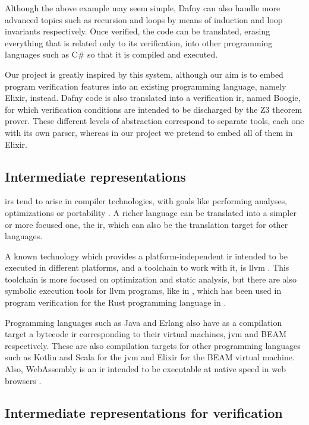 Although the above example may seem simple, Dafny can also handle more advanced
topics such as recursion and loops by means of induction and loop invariants
respectively. Once verified, the code can be translated, erasing everything that
is related only to its verification, into other programming languages such as
C\# so that it is compiled and executed. 

Our project is greatly inspired by this system, although our aim is to embed
program verification features into an existing programming language, namely
Elixir, instead. Dafny code is also translated into a verification \gls{ir}, 
named Boogie, for which verification conditions are intended to be discharged by
the Z3 theorem prover. These different levels of abstraction correspond to
separate tools, each one with its own parser, whereas in our project we pretend
to embed all of them in Elixir.

\subsection{Intermediate representations}

\gls{ir}s tend to arise in compiler technologies, with goals like performing
analyses, optimizations or portability \citep{FormalizingLLVMIR}. A richer
language can be translated into a simpler or more focused one, the \gls{ir},
which can also be the translation target for other languages.

A known technology which provides a platform-independent \gls{ir} intended to be
executed in different platforms, and a toolchain to work with it, is \gls{llvm}
\citep{LLVM}. This toolchain is more focused on optimization and static
analysis, but there are also symbolic execution tools for \gls{llvm} programs,
like in \cite{cadar2008klee}, which has been used in program verification for
the Rust programming language in \citep{lindner2018no}.

Programming languages such as Java and Erlang also have as a compilation target
a bytecode \gls{ir} corresponding to their virtual machines, \gls{jvm} 
\citep{lindholm2013java} and BEAM \citep{stenman2015erlang} respectively. These
are also compilation targets for other programming languages such as Kotlin and
Scala for the \gls{jvm} and Elixir for the BEAM virtual machine.  Also,
WebAssembly is an \gls{ir} intended to be executable at native speed in web
browsers \citep{wasm}.

\subsection{Intermediate representations for verification}

